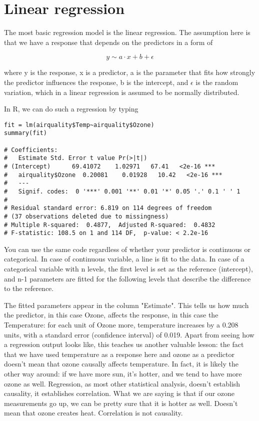 \documentclass[a4paper,twoside]{tufte-book} %
\begin{document}
\section{Linear regression}

The most basic regression model is the linear regression. The assumption here is that we have a response that depends on the predictors in a form of 

\begin{equation} \label{eq: linear regression}
y \sim a \cdot x + b + \epsilon 
\end{equation}

where y is the response, x is a predictor, a is the parameter that fits how strongly the predictor influences the response, b is the intercept, and $\epsilon$ is the random variation, which in a linear regression is assumed to be normally distributed. 

In R, we can do such a regression by typing

\begin{lstlisting}
fit = lm(airquality$Temp~airquality$Ozone)
summary(fit)

# Coefficients:
#   Estimate Std. Error t value Pr(>|t|)    
# (Intercept)      69.41072    1.02971   67.41   <2e-16 ***
#   airquality$Ozone  0.20081    0.01928   10.42   <2e-16 ***
#   ---
#   Signif. codes:  0 '***' 0.001 '**' 0.01 '*' 0.05 '.' 0.1 ' ' 1
# 
# Residual standard error: 6.819 on 114 degrees of freedom
# (37 observations deleted due to missingness)
# Multiple R-squared:  0.4877,  Adjusted R-squared:  0.4832 
# F-statistic: 108.5 on 1 and 114 DF,  p-value: < 2.2e-16
\end{lstlisting}

You can use the same code regardless of whether your predictor is continuous or categorical. In case of continuous variable, a line is fit to the data. In case of a categorical variable with n levels, the first level is set as the reference (intercept), and n-1 parameters are fitted for the following levels that describe the difference to the reference. 

The fitted parameters appear in the column "Estimate". This tells us how much the predictor, in this case Ozone, affects the response, in this case the Temperature: for each unit of Ozone more, temperature increases by a 0.208 units, with a standard error (confidence interval) of 0.019. Apart from seeing how a regression output looks like, this teaches us another valuable lesson: the fact that we have used temperature as a response here and ozone as a predictor doesn't mean that ozone causally affects temperature.  In fact, it is likely the other way around: if we have more sun, it's hotter, and we tend to have more ozone as well. Regression, as most other statistical analysis, doesn't establish causality, it establishes correlation. What we are saying is that if our ozone measurements go up, we can be pretty sure that it is hotter as well. Doesn't mean that ozone creates heat. Correlation is not causality. 
\end{document}
